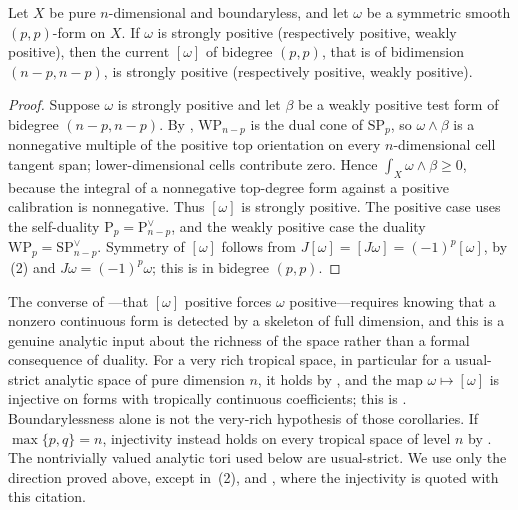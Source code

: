 \begin{proposition}
\label{prop:ch14-form-current-cones}
Let $X$ be pure $n$-dimensional and boundaryless, and let $\omega$ be a
symmetric smooth $(p,p)$-form on $X$.  If $\omega$ is strongly positive
(respectively positive, weakly positive), then the current $[\omega]$ of
bidegree $(p,p)$, that is of bidimension $(n-p,n-p)$, is strongly positive
(respectively positive, weakly positive).
\end{proposition}

\begin{proof}
Suppose $\omega$ is strongly positive and let $\beta$ be a weakly positive
test form of bidegree $(n-p,n-p)$.  By
, $\mathrm{WP}_{n-p}$ is the dual cone of
$\mathrm{SP}_p$, so $\omega\wedge\beta$ is a nonnegative multiple of
the positive top orientation on every $n$-dimensional cell tangent span;
lower-dimensional cells contribute zero. Hence
$\int_X\omega\wedge\beta\ge0$, because the integral of a nonnegative
top-degree form against a positive calibration is nonnegative.  Thus
$[\omega]$ is strongly positive.  The positive case uses the self-duality
$\mathrm{P}_p=\mathrm{P}_{n-p}^\vee$, and the weakly positive case the
duality $\mathrm{WP}_p=\mathrm{SP}_{n-p}^\vee$.  Symmetry of $[\omega]$
follows from $J[\omega]=[J\omega]=(-1)^p[\omega]$, by
\,(2) and $J\omega=(-1)^p\omega$; this is
 in bidegree $(p,p)$.
\end{proof}

\begin{remark}
\label{rem:ch14-form-injectivity}
The converse of ---that $[\omega]$
positive forces $\omega$ positive---requires knowing that a nonzero
continuous form is detected by a skeleton of full dimension, and this is a
genuine analytic input about the richness of the space rather than a formal
consequence of duality.  For a very rich tropical space, in particular for a
usual-strict analytic space of pure dimension $n$, it holds by
\cite[Theorem~16.4.4]{CLD25}, and the map
$\omega\mapsto[\omega]$ is injective on forms with tropically continuous
coefficients; this is \cite[Corollaries~7.3.9 and~7.3.10]{CLD25}.
Boundarylessness alone is not the very-rich hypothesis of those
corollaries. If $\max\{p,q\}=n$, injectivity instead holds on every
tropical space of level $n$ by \cite[Corollary~7.3.8]{CLD25}.
The nontrivially valued analytic tori used below are usual-strict.
We use
only the direction proved above, except in
\,(2),
 and , where
the injectivity is quoted with this citation.
\end{remark}

